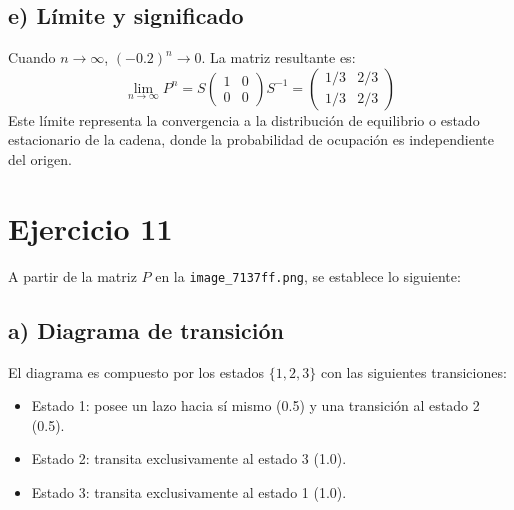 \documentclass[letterpaper, 12pt]{article}
\begin{document}
    \subsection*{e) Límite y significado}
    Cuando $n \to \infty$, $(-0.2)^n \to 0$. La matriz resultante es:
    $$\lim_{n \to \infty} P^n = S \begin{pmatrix} 1 & 0 \\ 0 & 0 \end{pmatrix} S^{-1} = \begin{pmatrix} 1/3 & 2/3 \\ 1/3 & 2/3 \end{pmatrix}$$
    Este límite representa la convergencia a la distribución de equilibrio o estado estacionario de la cadena, donde la probabilidad de ocupación es independiente del origen.
    \newpage

    \section*{Ejercicio 11}

    A partir de la matriz $P$ en la \texttt{image\_7137ff.png}, se establece lo siguiente:

    \subsection*{a) Diagrama de transición}
    El diagrama es compuesto por los estados $\{1, 2, 3\}$ con las siguientes transiciones:
    \begin{itemize}
        \item Estado 1: posee un lazo hacia sí mismo (0.5) y una transición al estado 2 (0.5).
        \item Estado 2: transita exclusivamente al estado 3 (1.0).
        \item Estado 3: transita exclusivamente al estado 1 (1.0).
    \end{itemize}

\end{document}
